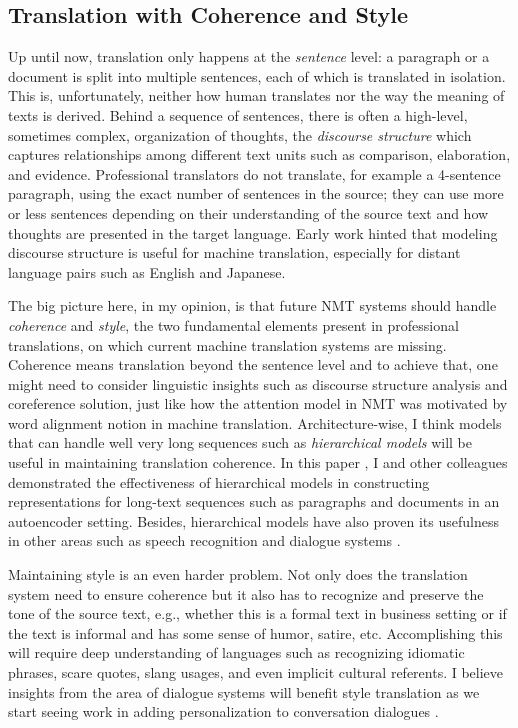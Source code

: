 \subsection{Translation with Coherence and Style}
Up until now, translation only happens at the {\it sentence} level: a paragraph or a document is split into multiple sentences, each of which is translated in isolation. This is, unfortunately, neither how human translates nor the way the meaning of texts is derived. Behind a sequence of sentences, there is often a high-level, sometimes complex, organization of thoughts, the {\it discourse structure} \cite{mann1988} which captures relationships among different text units such as comparison, elaboration, and evidence. Professional translators do not translate, for example a 4-sentence paragraph, using the exact number of sentences in the source; they can use more or less sentences depending on their understanding of the source text and how thoughts are presented in the target language. Early work \cite{marcu2000} hinted that modeling discourse structure is useful for machine translation, especially for distant language pairs such as English and Japanese.

The big picture here, in my opinion, is that future NMT systems should handle {\it coherence} and {\it style}, the two fundamental elements present in professional translations, on which current machine translation systems are missing. Coherence means translation beyond the sentence level and to achieve that, one might need to consider linguistic insights such as discourse structure analysis and coreference solution, just like how the attention model in NMT was motivated by word alignment notion in machine translation. 
Architecture-wise, I think models that can handle well very long sequences such as {\it hierarchical models} will be useful in maintaining translation coherence. In this paper \cite{li15}, I and other colleagues demonstrated the effectiveness of hierarchical models in constructing representations for long-text sequences such as paragraphs and documents in an autoencoder setting.
Besides, hierarchical models have also proven its usefulness in other areas such as speech recognition \cite{chan16} and dialogue systems \cite{serban16}.

Maintaining style is an even harder problem. Not only does the translation system need to ensure coherence but it also has to recognize and preserve the tone of the source text, e.g., whether this is a formal text in business setting or if the text is informal and has some sense of humor, satire, etc. Accomplishing this will require deep understanding of languages such as recognizing idiomatic phrases, scare quotes, slang usages, and even implicit cultural referents. I believe insights from the area of dialogue systems will benefit style translation as we start seeing work in adding personalization to conversation dialogues \cite{li16,alrfou16}.

